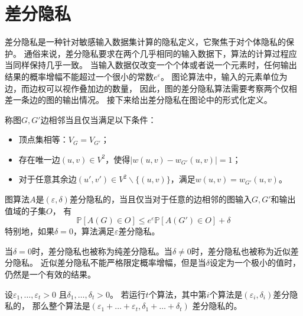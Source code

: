 \section{差分隐私}

差分隐私是一种针对敏感输入数据集计算的隐私定义，它聚焦于对个体隐私的保护。
通俗来说，差分隐私要求在两个几乎相同的输入数据下，算法的计算过程应当同样保持几乎一致。
当输入数据仅改变一个个体或者说一个元素时，任何输出结果的概率增幅不能超过一个很小的常数$e^\varepsilon$。
图论算法中，输入的元素单位为边，而边权可以视作叠加边的数量，
因此，图的差分隐私算法需要考察两个仅相差一条边的图的输出情况。
接下来给出差分隐私在图论中的形式化定义。

\begin{definition}[边相邻]
    称图$G,G'$边相邻当且仅当满足以下条件：
    \begin{itemize}
        \item 顶点集相等：$V_G=V_{G'}$；
        \item 存在唯一边$(u,v)\in V^2$，使得$|w(u,v)-w_{G'}(u,v)|=1$；
        \item 对于任意其余边$(u',v')\in V^2\backslash \{(u,v)\}$，满足$w(u,v)=w_{G'}(u,v)$。
    \end{itemize}
\end{definition}

\begin{definition}[差分隐私]\cite{dwork2006differential}
    图算法$A$是$(\varepsilon,\delta)$差分隐私的，当且仅当对于任意的边相邻的图输入$G,G'$和输出值域的子集$O$，
    有
    \begin{equation}
        \mathbb P[A(G)\in O]\leq e^\varepsilon\mathbb P[A(G')\in O]+\delta
    \end{equation}
    特别地，如果$\delta=0$，算法满足$\varepsilon$差分隐私。
\end{definition}
当$\delta=0$时，差分隐私也被称为纯差分隐私。当$\delta\neq 0$时，差分隐私也被称为近似差分隐私。
近似差分隐私不能严格限定概率增幅，但是当$\delta$设定为一个极小的值时，仍然是一个有效的结果。

\begin{theorem}[基本组合]\cite{dwork2006calibrating}\cite{dwork2009differential}
    \label{the:basic}
    设$\varepsilon_1,\ldots,\varepsilon_t > 0$
    且$\delta_1,\ldots,\delta_t > 0$。
    若运行$t$个算法，其中第$i$个算法是$(\varepsilon_i,\delta_i)$差分隐私的，
    那么整个算法是$(\varepsilon_1 + \ldots + \varepsilon_t,\delta_1 + \ldots + \delta_t)$
    差分隐私的。
\end{theorem}

